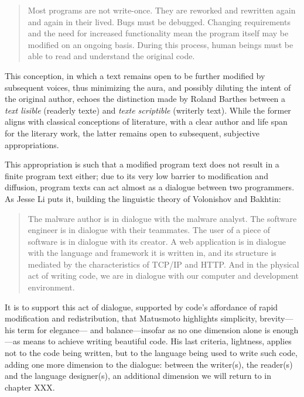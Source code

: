 \begin{quote}
  Most programs are not write-once. They are reworked and rewritten again and again in their lived. Bugs must be debugged. Changing requirements and the need for increased functionality mean the program itself may be modified on an ongoing basis. During this process, human beings must be able to read and understand the original code.
\end{quote}

This conception, in which a text remains open to be further modified by subsequent voices, thus minimizing the aura, and possibly diluting the intent of the original author, echoes the distinction made by Roland Barthes between a \emph{text lisible} (readerly texte) and \emph{texte scriptible} (writerly text). While the former aligns with classical conceptions of literature, with a clear author and life span for the literary work, the latter remains open to subsequent, subjective appropriations.

This appropriation is such that a modified program text does not result in a finite program text either; due to its very low barrier to modification and diffusion, program texts can act almost as a dialogue between two programmers. As Jesse Li puts it, building the linguistic theory of Volonishov and Bakhtin:

\begin{quote}
  The malware author is in dialogue with the malware analyst. The software engineer is in dialogue with their teammates. The user of a piece of software is in dialogue with its creator. A web application is in dialogue with the language and framework it is written in, and its structure is mediated by the characteristics of TCP/IP and HTTP. And in the physical act of writing code, we are in dialogue with our computer and development environment.\cite{li_where_2020}
\end{quote}

It is to support this act of dialogue, supported by code's affordance of rapid modification and redistribution, that Matusmoto highlights simplicity, brevity—his term for elegance— and balance—insofar as no one dimension alone is enough—as means to achieve writing beautiful code. His last criteria, lightness, applies not to the code being written, but to the language being used to write such code, adding one more dimension to the dialogue: between the writer(s), the reader(s) and the language designer(s), an additional dimension we will return to in chapter XXX.

